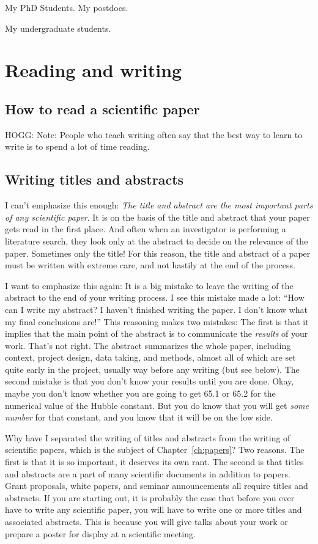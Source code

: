 \documentclass[letterpaper]{book}
\begin{document}
My PhD Students. My postdocs.

My undergraduate students.

\part{Reading and writing}%

\chapter{How to read a scientific paper}\label{ch:reading}

HOGG: Note: People who teach writing often say that the best way to learn to write is to spend a lot of time reading.

\chapter{Writing titles and abstracts}\label{ch:abstracts}

I can't emphasize this enough: \emph{The title and abstract are the most important parts of any scientific paper}.
It is on the basis of the title and abstract that your paper gets read in the first place.
And often when an investigator is performing a literature search, they look only at the abstract to decide on the relevance of the paper.
Sometimes only the title!
For this reason, the title and abstract of a paper must be written with extreme care, and not hastily at the end of the process.

I want to emphasize this again: It is a big mistake to leave the writing of the abstract to the end of your writing process.
I see this mistake made a lot:
``How can I write my abstract? I haven't finished writing the paper. I don't know what my final conclusions are!''
This reasoning makes two mistakes:
The first is that it implies that the main point of the abstract is to communicate the \emph{results} of your work.
That's not right.
The abstract summarizes the whole paper, including context, project design, data taking, and methods, almost all of which are set quite early in the project, usually way before any writing (but see below).
The second mistake is that you don't know your results until you are done.
Okay, maybe you don't know whether you are going to get 65.1 or 65.2 for the numerical value of the Hubble constant.
But you do know that you will get \emph{some number} for that constant, and you know that it will be on the low side.

Why have I separated the writing of titles and abstracts from the writing of scientific papers, which is the subject of Chapter~\ref{ch:papers}?
Two reasons.
The first is that it is so important, it deserves its own rant.
The second is that titles and abstracts are a part of many scientific documents in addition to papers.
Grant proposals, white papers, and seminar announcements all require titles and abstracts.
If you are starting out, it is probably the case that before you ever have to write any scientific paper, you will have to write one or more titles and associated abstracts.
This is because you will give talks about your work or prepare a poster for display at a scientific meeting.
\end{document}
